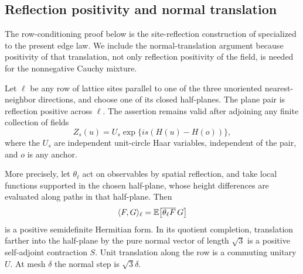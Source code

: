 \subsection{Reflection positivity and normal translation}

The row-conditioning proof below is the site-reflection construction
of \cite[Section~3, example~5]{FILS1978} specialized to the present edge law.
We include the normal-translation argument because positivity of that
translation, not only reflection positivity of the field, is needed
for the nonnegative Cauchy mixture.

\begin{proposition}
\label{prop:reflection-transfer}
Let $\ell$ be any row of lattice sites parallel to one of the three
unoriented nearest-neighbor directions, and choose one of its closed
half-planes.  The plane pair is reflection positive across $\ell$.
The assertion remains valid after adjoining any finite collection of fields
\begin{equation}
 \label{plane:eq:phases}
 Z_s(u)=U_s\exp\{is(H(u)-H(o))\},
\end{equation}
where the $U_s$ are independent unit-circle Haar variables, independent of
the pair, and $o$ is any anchor.

More precisely, let $\theta_\ell$ act on observables by spatial reflection,
and take local functions supported in the chosen half-plane, whose
height differences are evaluated along paths in that half-plane.  Then
\[
 \langle F,G\rangle_\ell
     =\mathbb E\big[\overline{\theta_\ell F}\,G\big]
\]
is a positive semidefinite Hermitian form.  In its quotient completion,
translation farther into the half-plane by the pure normal vector of
length $\sqrt3$ is a positive self-adjoint contraction $S$.  Unit
translation along the row is a commuting unitary $U$.  At mesh $\delta$
the normal step is $\sqrt3\delta$.
\end{proposition}

